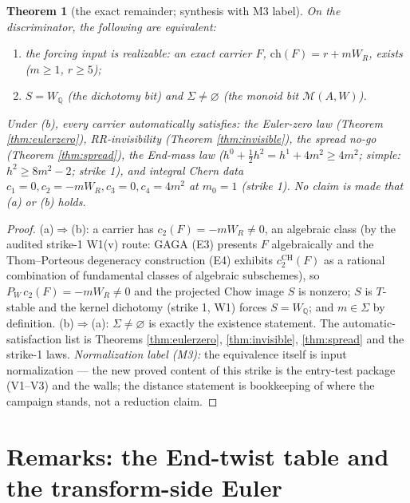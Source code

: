 \documentclass[11pt]{article}
\newtheorem{theorem}{Theorem}
\begin{document}
\begin{theorem}[the exact remainder; synthesis with M3 label]\label{thm:remainder}
On the discriminator, the following are equivalent:
\begin{enumerate}[itemsep=1pt,label=(\alph*)]
\item the forcing input is realizable: an exact carrier $F$, $\mathrm{ch}(F)=r+mW_R$, exists
($m\ge1$, $r\ge5$);
\item $S=W_\mathbb{Q}$ \textup{(the dichotomy bit)} \textup{and} $\Sigma\ne\varnothing$
\textup{(the monoid bit $\mathcal{M}(A,W)$)}.
\end{enumerate}
Under (b), every carrier automatically satisfies: the Euler-zero law
(Theorem \ref{thm:eulerzero}), RR-invisibility (Theorem \ref{thm:invisible}), the spread no-go
(Theorem \ref{thm:spread}), the End-mass law ($h^0+\tfrac12h^2=h^1+4m^2\ge4m^2$; simple:
$h^2\ge8m^2-2$; strike 1), and integral Chern data $c_1=0,c_2=-mW_R,c_3=0,c_4=4m^2$ at $m_0=1$
(strike 1). No claim is made that (a) or (b) holds.
\end{theorem}

\begin{proof}
(a)$\Rightarrow$(b): a carrier has $c_2(F)=-mW_R\ne0$, an algebraic class (by the audited strike-1
W1(v) route: GAGA (E3) presents $F$ algebraically and the Thom--Porteous degeneracy construction (E4)
exhibits $c_2^{\mathrm{CH}}(F)$ as a rational combination of fundamental classes of algebraic subschemes), so $P_W\,c_2(F)=-mW_R\ne0$ and the projected Chow image $S$ is nonzero;
$S$ is $T$-stable and the kernel dichotomy (strike 1, W1) forces $S=W_\mathbb{Q}$; and
$m\in\Sigma$ by definition. (b)$\Rightarrow$(a): $\Sigma\ne\varnothing$ is exactly the existence
statement. The automatic-satisfaction list is Theorems \ref{thm:eulerzero}, \ref{thm:invisible},
\ref{thm:spread} and the strike-1 laws. \emph{Normalization label (M3):} the equivalence itself is input
normalization --- the new proved content of this strike is the entry-test package
(V1--V3) and the walls; the distance statement is bookkeeping of where the campaign stands, not a
reduction claim.
\end{proof}

\section{Remarks: the End-twist table and the transform-side Euler}\label{sec:remarks}
\end{document}
